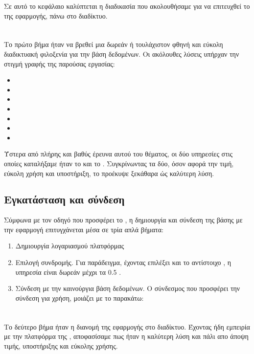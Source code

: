 \quad Σε αυτό το κεφάλαιο καλύπτεται η διαδικασία που ακολουθήσαμε για να επιτευχθεί το  της  εφαρμογής, πάνω στο διαδίκτυο.
\section{}
\quad Το πρώτο βήμα ήταν να βρεθεί μια δωρεάν ή τουλάχιστον φθηνή και εύκολη διαδικτυακή φιλοξενία για την  βάση δεδομένων. Οι ακόλουθες λύσεις υπήρχαν την στιγμή γραφής της παρούσας εργασίας:
\begin{itemize}
    \item {}
    \item {}
    \item {}
    \item {}
    \item {}
    \item {}
    \item {}
\end{itemize}
\quad Ύστερα από πλήρης και βαθύς έρευνα αυτού του θέματος, οι δύο υπηρεσίες στις οποίες καταλήξαμε ήταν το  και το . Συγκρίνωντας τα δύο, όσον αφορά την τιμή, εύκολη χρήση και υποστήριξη, το  προέκυψε ξεκάθαρα ώς καλύτερη λύση.
\subsection*{Εγκατάσταση και σύνδεση}
\quad Σύμφωνα με τον οδηγό που προσφέρει το , η δημιουργία και σύνδεση της βάσης με την εφαρμογή επιτυγχάνεται μέσα σε τρία απλά βήματα:
\begin{enumerate}
    \item Δημιουργία λογαριασμού πλατφόρμας
    \item Επιλογή συνδρομής. Για παράδειγμα, έχοντας επιλέξει  και το αντίστοιχο , η υπηρεσία είναι δωρεάν μέχρι τα 0.5 .
    \item Σύνδεση με την καινούργια βάση δεδομένων. Ο σύνδεσμος που προσφέρει την σύνδεση για χρήση, μοιάζει με το παρακάτω:\par
    \quad {}
\end{enumerate}


\section{}
\quad Το δεύτερο βήμα ήταν η διανομή της εφαρμογής στο διαδίκτυο. Έχοντας ήδη εμπειρία με την  πλατφόρμα της , αποφασίσαμε πως ήταν η καλύτερη λύση και πάλι απο άποψη τιμής, υποστήριξης και εύκολης χρήσης.

